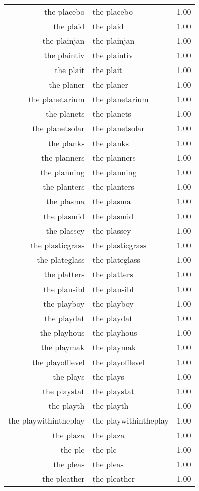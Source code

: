 \begin{table}[ht]
\begin{tabular}{rlr}
  the placebo & the placebo & 1.00 \\ 
  the plaid & the plaid & 1.00 \\ 
  the plainjan & the plainjan & 1.00 \\ 
  the plaintiv & the plaintiv & 1.00 \\ 
  the plait & the plait & 1.00 \\ 
  the planer & the planer & 1.00 \\ 
  the planetarium & the planetarium & 1.00 \\ 
  the planets & the planets & 1.00 \\ 
  the planetsolar & the planetsolar & 1.00 \\ 
  the planks & the planks & 1.00 \\ 
  the planners & the planners & 1.00 \\ 
  the planning & the planning & 1.00 \\ 
  the planters & the planters & 1.00 \\ 
  the plasma & the plasma & 1.00 \\ 
  the plasmid & the plasmid & 1.00 \\ 
  the plassey & the plassey & 1.00 \\ 
  the plasticgrass & the plasticgrass & 1.00 \\ 
  the plateglass & the plateglass & 1.00 \\ 
  the platters & the platters & 1.00 \\ 
  the plausibl & the plausibl & 1.00 \\ 
  the playboy & the playboy & 1.00 \\ 
  the playdat & the playdat & 1.00 \\ 
  the playhous & the playhous & 1.00 \\ 
  the playmak & the playmak & 1.00 \\ 
  the playofflevel & the playofflevel & 1.00 \\ 
  the plays & the plays & 1.00 \\ 
  the playstat & the playstat & 1.00 \\ 
  the playth & the playth & 1.00 \\ 
  the playwithintheplay & the playwithintheplay & 1.00 \\ 
  the plaza & the plaza & 1.00 \\ 
  the plc & the plc & 1.00 \\ 
  the pleas & the pleas & 1.00 \\ 
  the pleather & the pleather & 1.00 \\ 

\end{tabular}
\end{table}
